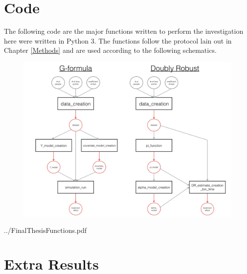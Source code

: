 \chapter{Code}
\label{AppendixA}
The following code are the major functions written to perform the investigation here were written in Python 3.  The functions follow the protocol lain out in Chapter \ref{Methods} and are used according to the following schematics.  


\begin{figure}[h!]
\includegraphics[width = 1.1\linewidth]{figures/schematic.png}
\caption[Schematic of the Python Functions For Both Methods]{}
\end{figure}

\newpage



    {../FinalThesisFunctions.pdf}
    
\chapter{Extra Results} \label{AppendixB}


